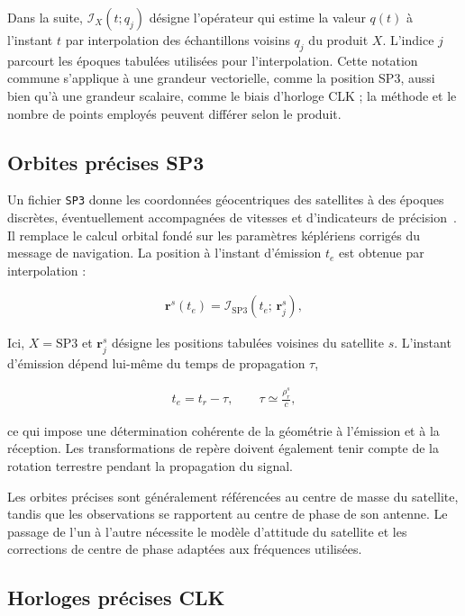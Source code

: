 Dans la suite, $\mathcal I_X(t; q_j)$ désigne l'opérateur qui estime la valeur
$q(t)$ à l'instant $t$ par interpolation des échantillons voisins $q_j$ du
produit $X$. L'indice $j$ parcourt les époques tabulées utilisées pour
l'interpolation. Cette notation commune s'applique à une grandeur vectorielle,
comme la position SP3, aussi bien qu'à une grandeur scalaire, comme le biais
d'horloge CLK ; la méthode et le nombre de points employés peuvent différer
selon le produit.

\subsection{Orbites précises SP3}

Un fichier \texttt{SP3} donne les coordonnées géocentriques des satellites à
des époques discrètes, éventuellement accompagnées de vitesses et
d'indicateurs de précision~\cite{hilla2016sp3d}. Il remplace le calcul orbital fondé sur les
paramètres képlériens corrigés du message de navigation. La position à
l'instant d'émission $t_e$ est obtenue par interpolation :

\begin{align}
\mathbf r^s(t_e)
=
\mathcal{I}_{\mathrm{SP3}}
\!\left(t_e;\,\mathbf r_j^s\right),
\label{eq:sp3_interpolation}
\end{align}

Ici, $X=\mathrm{SP3}$ et $\mathbf r_j^s$ désigne les positions tabulées
voisines du satellite $s$. L'instant d'émission dépend lui-même du temps de
propagation $\tau$,

\begin{align}
t_e=t_r-\tau,
\qquad
\tau\simeq\frac{\rho_r^s}{c},
\label{eq:transmission_time}
\end{align}

ce qui impose une détermination cohérente de la géométrie à l'émission et à la
réception. Les transformations de repère doivent également tenir compte de la
rotation terrestre pendant la propagation du signal.

Les orbites précises sont généralement référencées au centre de masse du
satellite, tandis que les observations se rapportent au centre de phase de
son antenne. Le passage de l'un à l'autre nécessite le modèle d'attitude du
satellite et les corrections de centre de phase adaptées aux fréquences
utilisées.

\subsection{Horloges précises CLK}\label{sec:clk_precise}

